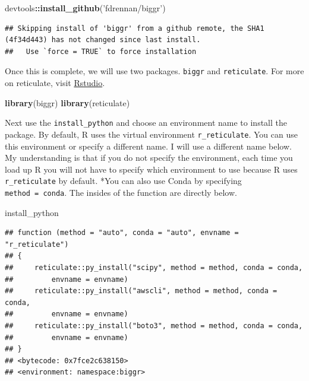 \documentclass[]{book}
\newenvironment{Shaded}{\begin{snugshade}}{\end{snugshade}}
\newcommand{\KeywordTok}[1]{\textcolor[rgb]{0.13,0.29,0.53}{\textbf{#1}}}
\newcommand{\NormalTok}[1]{#1}
\newcommand{\OperatorTok}[1]{\textcolor[rgb]{0.81,0.36,0.00}{\textbf{#1}}}
\newcommand{\StringTok}[1]{\textcolor[rgb]{0.31,0.60,0.02}{#1}}
\begin{document}
\begin{Shaded}
\begin{Highlighting}[]
\NormalTok{devtools}\OperatorTok{::}\KeywordTok{install_github}\NormalTok{(}\StringTok{'fdrennan/biggr'}\NormalTok{)}
\end{Highlighting}
\end{Shaded}

\begin{verbatim}
## Skipping install of 'biggr' from a github remote, the SHA1 (4f34d443) has not changed since last install.
##   Use `force = TRUE` to force installation
\end{verbatim}

Once this is complete, we will use two packages. \texttt{biggr} and \texttt{reticulate}. For more on reticulate, visit \href{https://rstudio.github.io/reticulate/}{Rstudio}.

\begin{Shaded}
\begin{Highlighting}[]
\KeywordTok{library}\NormalTok{(biggr)}
\KeywordTok{library}\NormalTok{(reticulate)}
\end{Highlighting}
\end{Shaded}

Next use the \texttt{install\_python} and choose an environment name to install the package. By default, R uses the virtual environment \texttt{r\_reticulate}. You can use this environment or specify a different name. I will use a different name below. My understanding is that if you do not specify the environment, each time you load up R you will not have to specify which environment to use because R uses \texttt{r\_reticulate} by default. *You can also use Conda by specifying \texttt{method\ =\ conda}. The insides of the function are directly below.

\begin{Shaded}
\begin{Highlighting}[]
\NormalTok{install_python}
\end{Highlighting}
\end{Shaded}

\begin{verbatim}
## function (method = "auto", conda = "auto", envname = "r_reticulate") 
## {
##     reticulate::py_install("scipy", method = method, conda = conda, 
##         envname = envname)
##     reticulate::py_install("awscli", method = method, conda = conda, 
##         envname = envname)
##     reticulate::py_install("boto3", method = method, conda = conda, 
##         envname = envname)
## }
## <bytecode: 0x7fce2c638150>
## <environment: namespace:biggr>
\end{verbatim}
\end{document}
